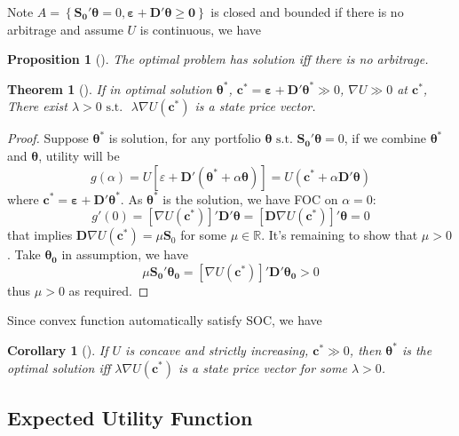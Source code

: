 \documentclass[
  12pt,
  oneside]{book}
\newcommand{\bm}[1]{\symbf{#1}}
\newtheorem{theorem}{Theorem}[chapter]
\newtheorem{corollary}{Corollary}[chapter]
\newtheorem{proposition}{Proposition}[chapter]
\theoremstyle{definition}
\theoremstyle{definition}
\theoremstyle{definition}
\theoremstyle{definition}
\theoremstyle{remark}
\begin{document}
Note \(A=\left\{ \bm{S_0'\theta}= 0, \bm{\varepsilon+D'\theta \ge 0} \right\}\) is closed and bounded if there is no arbitrage and assume \(U\) is continuous, we have

\begin{proposition}[]
The optimal problem has solution iff there is no arbitrage.
\end{proposition}

\begin{theorem}[]
\protect\hypertarget{thm:utility-state}{}\label{thm:utility-state}If in optimal solution \(\bm{\theta^{*}}\), \(\bm{c^{*}}=\bm{\varepsilon+D'\theta^{*}}\gg 0\), \(\nabla U\gg 0\) at \(\bm{c}^{*}\),
There exist \(\lambda>0 \text{ s.t. }\) \(\lambda \nabla U(\bm{c}^{*})\) is a state price vector.
\end{theorem}

\begin{proof}
Suppose \(\bm{\theta^{*}}\) is solution, for any portfolio \(\bm{\theta} \text{ s.t. } \bm{S_0'\theta}=0\), if we combine \(\bm{\theta^{*}}\) and \(\bm{\theta}\), utility will be
\[
g(\alpha)=U[\varepsilon+\bm{D'}(\bm{\theta^{*}}+\alpha \bm{\theta})]=U(\bm{c^{*}}+\alpha \bm{D'\theta})
\]
where \(\bm{c}^{*}=\bm{\varepsilon+D'\theta^{*}}\). As \(\bm{\theta^{*}}\) is the solution, we have FOC on \(\alpha=0\):
\[
g'(0)=\left[ \nabla U(\bm{c}^{*}) \right]'\bm{D'\theta}=[\bm{D}\nabla U(\bm{c}^{*})]'\bm{\theta}=0
\]
that implies \(\bm{D}\nabla U(\bm{c^{*}})=\mu \bm{S}_{0}\) for some \(\mu \in \mathbb{R}\). It's remaining to show that \(\mu>0\). Take \(\bm{\theta_0}\) in assumption, we have
\[
\mu \bm{S_0'\theta_0}=\left[ \nabla U(\bm{c}^{*}) \right]'\bm{D'\theta_0}>0
\]
thus \(\mu>0\) as required.
\end{proof}

Since convex function automatically satisfy SOC, we have

\begin{corollary}[]
\protect\hypertarget{cor:concave-iff}{}\label{cor:concave-iff}If \(U\) is concave and strictly increasing, \(\bm{c^{*}}\gg 0\), then \(\bm{\theta^{*}}\) is the optimal solution iff \(\lambda \nabla U(\bm{c^{*}})\) is a state price vector for some \(\lambda >0\).
\end{corollary}

\hypertarget{expected-utility-function}{%
\subsection{Expected Utility Function}\label{expected-utility-function}}
\end{document}
